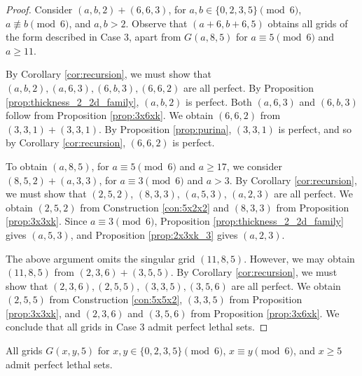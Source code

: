 \begin{proof}
Consider $(a,b,2) + (6,6,3)$, for $a,b \in \{0,2,3,5\} \pmod 6$, $a \not\equiv b \pmod 6$, and $a,b > 2$. Observe that $(a+6,b+6,5)$ obtains all grids of the form described in Case 3, apart from $G(a,8,5)$ for $a \equiv 5 \pmod 6$ and $a \geq 11$.

By Corollary \ref{cor:recursion}, we must show that $(a,b,2), (a,6,3), (6,b,3), (6,6,2)$ are all perfect. By Proposition \ref{prop:thickness_2_2d_family}, $(a,b,2)$ is perfect. Both $(a,6,3)$ and $(6,b,3)$ follow from Proposition \ref{prop:3x6xk}. We obtain $(6,6,2)$ from $(3,3,1)+(3,3,1)$. By Proposition \ref{prop:purina}, $(3,3,1)$ is perfect, and so by Corollary \ref{cor:recursion}, $(6,6,2)$ is perfect.

To obtain $(a,8,5)$, for $a \equiv 5 \pmod 6$ and $a \geq 17$, we consider $(8,5,2) + (a,3,3)$, for $a \equiv 3 \pmod 6$ and $a>3$. By Corollary \ref{cor:recursion}, we must show that $(2,5,2)$, $(8,3,3)$, $(a,5,3)$, $(a,2,3)$ are all perfect. We obtain $(2,5,2)$ from Construction \ref{con:5x2x2} and $(8,3,3)$ from Proposition \ref{prop:3x3xk}. Since $a \equiv 3 \pmod 6$, Proposition \ref{prop:thickness_2_2d_family} gives $(a,5,3)$, and Proposition \ref{prop:2x3xk_3} gives $(a,2,3)$. 

The above argument omits the singular grid $(11,8,5)$. However, we may obtain $(11,8,5)$ from $(2,3,6)+(3,5,5)$. By Corollary \ref{cor:recursion}, we must show that $(2,3,6), (2,5,5)$, $(3,3,5), (3,5,6)$ are all perfect. We obtain $(2,5,5)$ from Construction \ref{con:5x5x2}, $(3,3,5)$ from Proposition \ref{prop:3x3xk}, and $(2,3,6)$ and $(3,5,6)$ from Proposition \ref{prop:3x6xk}. We conclude that all grids in Case 3 admit perfect lethal sets.
\end{proof}

\begin{lem}
\label{lem:thickness_5_case_4}
All grids $G(x,y,5)$ for $x,y \in \{0,2,3,5\} \pmod 6$, $x \equiv y \pmod 6$, and $x \geq 5$ admit perfect lethal sets.
\end{lem}

